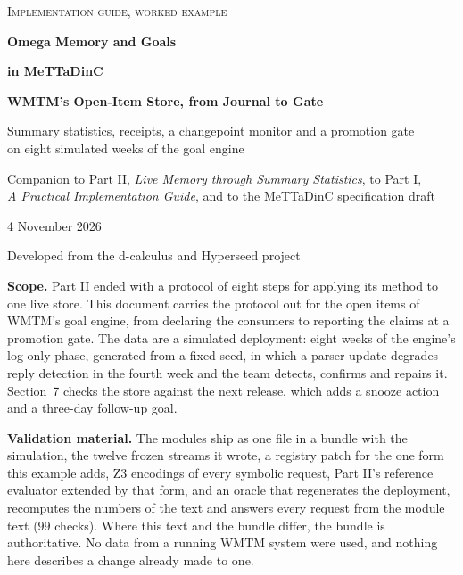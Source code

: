 \documentclass[11pt]{article}
\theoremstyle{definition}
\theoremstyle{plain}
\newcommand{\nchecks}{99}
\begin{document}
\hypersetup{pageanchor=false}
\begin{titlepage}
\thispagestyle{empty}
\vspace*{2.2cm}
{\color{dcblue}\large\scshape Implementation guide, worked example\par}
\vspace{1.4cm}
{\color{dcblue}\fontsize{28}{34}\selectfont\bfseries Omega Memory and Goals\par}
\vspace{0.3cm}
{\color{dcblue}\fontsize{28}{34}\selectfont\bfseries in MeTTaDinC\par}
\vspace{0.7cm}
{\LARGE\bfseries WMTM's Open-Item Store, from Journal to Gate\par}
\vspace{0.7cm}
{\large Summary statistics, receipts, a changepoint monitor and a promotion gate\\ on eight
simulated weeks of the goal engine\par}
\vspace{1.6cm}
{\large Companion to Part II, \emph{Live Memory through Summary Statistics}, to Part I,\\
\emph{A Practical Implementation Guide}, and to the MeTTaDinC specification draft\par}
\vspace{0.4cm}
{4 November 2026\par}
\vspace{0.8cm}
{Developed from the d-calculus and Hyperseed project\par}
\vfill
\noindent\begin{minipage}{\textwidth}
\small
{\color{dcblue}\bfseries Scope.} Part II ended with a protocol of eight steps for applying its
method to one live store. This document carries the protocol out for the open items of WMTM's goal
engine, from declaring the consumers to reporting the claims at a promotion gate. The data are a
simulated deployment: eight weeks of the engine's log-only phase, generated from a fixed seed, in
which a parser update degrades reply detection in the fourth week and the team detects, confirms
and repairs it. Section~7 checks the store against the next release, which adds a snooze action
and a three-day follow-up goal.

\smallskip
{\color{dcblue}\bfseries Validation material.} The modules ship as one file in a bundle with the
simulation, the twelve frozen streams it wrote, a registry patch for the one form this example
adds, Z3 encodings of every symbolic request, Part II's reference evaluator extended by that form,
and an oracle that regenerates the deployment, recomputes the numbers of the text and answers
every request from the module text ($\nchecks$ checks). Where this text and the bundle differ, the
bundle is authoritative. No data from a running WMTM system were used, and nothing here describes
a change already made to one.
\end{minipage}
\end{titlepage}
\hypersetup{pageanchor=true}
\end{document}
